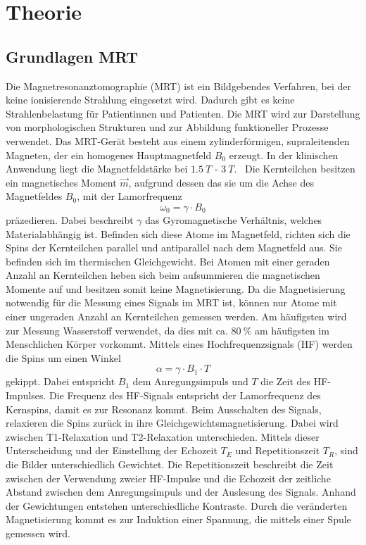 \chapter{Theorie}

\section{Grundlagen MRT}
Die Magnetresonanztomographie (MRT) ist ein Bildgebendes Verfahren, bei der keine ionisierende Strahlung eingesetzt wird.
Dadurch gibt es keine Strahlenbelastung für Patientinnen und Patienten.
Die MRT wird zur Darstellung von morphologischen Strukturen und zur Abbildung funktioneller Prozesse verwendet.
Das MRT-Gerät besteht aus einem zylinderförmigen, supraleitenden Magneten, der ein homogenes Hauptmagnetfeld $B_0$ erzeugt. %
In der klinischen Anwendung liegt die Magnetfeldstärke bei $\qty{1.5}{T}$ - $\qty{3}{T}$.~\cite{Schlegel}
Die Kernteilchen besitzen ein magnetisches Moment $\vec{m}$, aufgrund dessen das sie um die Achse des Magnetfeldes $B_0$, mit der Lamorfrequenz 
\begin{equation}
    \omega_0 = \gamma \cdot B_0
\end{equation}
präzedieren. Dabei beschreibt $\gamma$ das Gyromagnetische Verhältnis, welches Materialabhängig ist.
Befinden sich diese Atome im Magnetfeld,
richten sich die Spins der Kernteilchen parallel und antiparallel nach dem Magnetfeld aus. Sie befinden sich im thermischen Gleichgewicht.
Bei Atomen mit einer geraden Anzahl an Kernteilchen heben sich beim aufsummieren die magnetischen Momente auf und besitzen somit keine
Magnetisierung. 
Da die Magnetisierung notwendig für die Messung eines Signals im MRT ist, können nur Atome mit einer ungeraden Anzahl an Kernteilchen gemessen werden.
Am häufigsten wird zur Messung Wasserstoff verwendet, da dies mit ca. $\qty{80}{\%}$ am häufigsten im Menschlichen Körper vorkommt.
Mittels eines Hochfrequenzsignals (HF) werden die Spins um einen Winkel
\begin{equation}
    \alpha = \gamma \cdot B_1 \cdot T 
\end{equation}
gekippt. Dabei entspricht $B_1$ dem Anregungsimpuls und $T$ die Zeit des HF-Impulses.
Die Frequenz des HF-Signals entspricht der Lamorfrequenz des Kernspins, damit es zur Resonanz kommt. 
Beim Ausschalten des Signals, relaxieren die Spins zurück in ihre Gleichgewichtsmagnetisierung. 
Dabei wird zwischen T1-Relaxation und T2-Relaxation unterschieden. Mittels dieser Unterscheidung und der Einstellung der Echozeit $T_E$ und 
Repetitionszeit $T_R$, sind die Bilder unterschiedlich Gewichtet.
Die Repetitionszeit beschreibt die Zeit zwischen der Verwendung zweier HF-Impulse und die Echozeit der zeitliche Abstand zwischen dem Anregungsimpuls und der Auslesung des Signals. 
Anhand der Gewichtungen entstehen unterschiedliche Kontraste.
Durch die veränderten Magnetisierung kommt es zur Induktion einer Spannung, die mittels einer Spule gemessen wird.~\cite{Pollmann}


